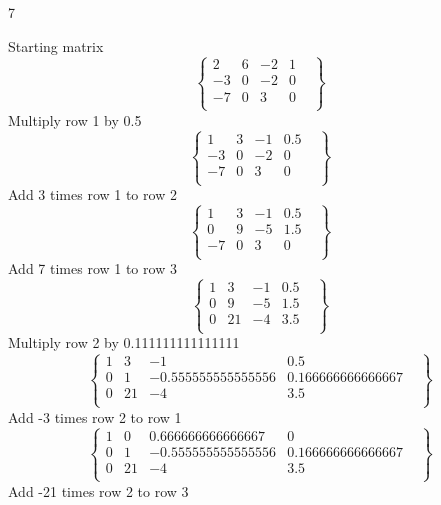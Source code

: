 \documentclass{exercises}
\begin{document}
\begin{exr}{}{7}
\begin{enumerate}
		Starting matrix
\begin{equation}
\left\{
    \begin{array}{ccc|cl}2&6&-2&1&\\-3&0&-2&0&\\-7&0&3&0&\\\end{array}
\right\}
\end{equation}Multiply row 1 by 0.5
\begin{equation}
\left\{
    \begin{array}{ccc|cl}1&3&-1&0.5&\\-3&0&-2&0&\\-7&0&3&0&\\\end{array}
\right\}
\end{equation}Add 3 times row 1 to row 2
\begin{equation}
\left\{
    \begin{array}{ccc|cl}1&3&-1&0.5&\\0&9&-5&1.5&\\-7&0&3&0&\\\end{array}
\right\}
\end{equation}Add 7 times row 1 to row 3
\begin{equation}
\left\{
    \begin{array}{ccc|cl}1&3&-1&0.5&\\0&9&-5&1.5&\\0&21&-4&3.5&\\\end{array}
\right\}
\end{equation}Multiply row 2 by 0.111111111111111
\begin{equation}
\left\{
    \begin{array}{ccc|cl}1&3&-1&0.5&\\0&1&-0.555555555555556&0.166666666666667&\\0&21&-4&3.5&\\\end{array}
\right\}
\end{equation}Add -3 times row 2 to row 1
\begin{equation}
\left\{
    \begin{array}{ccc|cl}1&0&0.666666666666667&0&\\0&1&-0.555555555555556&0.166666666666667&\\0&21&-4&3.5&\\\end{array}
\right\}
\end{equation}Add -21 times row 2 to row 3

\end{enumerate}
\end{exr}
\end{document}
